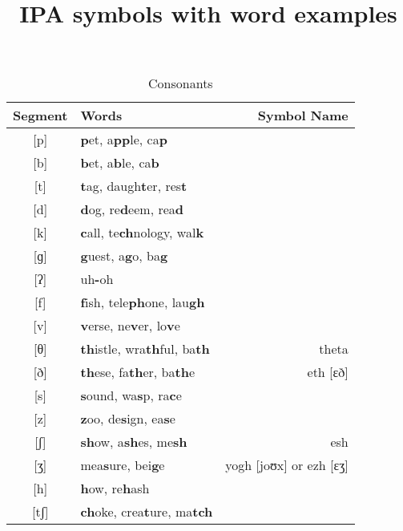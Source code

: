\documentclass{article}
\title{IPA symbols with word examples}
\date{}
\begin{document}
  \maketitle

  

  \begin{table}[htb]
    \caption{Consonants}
    \centering
    \vspace{0.5cm}
    \begin{tabular}{c | l r}
      Segment & Words & Symbol Name \\
      \hline
      {[}p{]} & \textbf{p}et, a\textbf{pp}le, ca\textbf{p}          & \\
      {[}b{]}  & \textbf{b}et, a\textbf{b}le, ca\textbf{b}          & \\
      {[}t{]}  & \textbf{t}ag, daugh\textbf{t}er, res\textbf{t}     & \\
      {[}d{]}  & \textbf{d}og, re\textbf{d}eem, rea\textbf{d}       & \\
      {[}k{]}  & \textbf{c}all, te\textbf{ch}nology, wal\textbf{k}  & \\
      {[}ɡ{]}  & \textbf{g}uest, a\textbf{g}o, ba\textbf{g}         & \\
      {[}ʔ{]}  & uh\textbf{-}oh                                     & \\
      {[}f{]}  & \textbf{f}ish, tele\textbf{ph}one, lau\textbf{gh}  & \\
      {[}v{]}  & \textbf{v}erse, ne\textbf{v}er, lo\textbf{v}e      & \\
      {[}θ{]}  & \textbf{th}istle, wra\textbf{th}ful, ba\textbf{th} & theta\\
      {[}ð{]}  & \textbf{th}ese, fa\textbf{th}er, ba\textbf{th}e    & eth {[}ɛð{]}\\
      {[}s{]}  & \textbf{s}ound, wa\textbf{s}p, ra\textbf{c}e       & \\
      {[}z{]}  & \textbf{z}oo, de\textbf{s}ign, ea\textbf{s}e       & \\
      {[}ʃ{]}  & \textbf{sh}ow, a\textbf{sh}es, me\textbf{sh}       & esh \\
      {[}ʒ{]}  & mea\textbf{s}ure, bei\textbf{g}e                   & yogh {[}joʊx{]} or ezh {[}ɛʒ{]}\\
      {[}h{]}  & \textbf{h}ow, re\textbf{h}ash                      & \\
      {[}tʃ{]} & \textbf{ch}oke, crea\textbf{t}ure, ma\textbf{tch}  & \\

\end{tabular}
\end{table}
\end{document}
